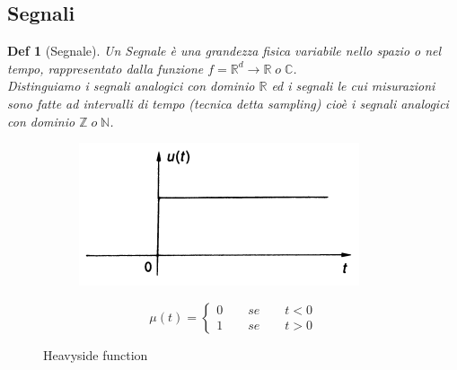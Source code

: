 \documentclass[a4paper]{article}
\newtheorem*{definition}{Def}
\newcommand{\R}[0]{\mathbb{R}}
\newcommand{\C}[0]{\mathbb{C}}
\begin{document}
\subsection{Segnali}
\begin{definition}[Segnale]
	Un Segnale è una grandezza fisica variabile nello spazio o nel tempo, rappresentato dalla funzione $f = \R^d \rightarrow \R \; o \; \C$.\\
	Distinguiamo i segnali \textit{analogici} con dominio $\R$ ed i segnali le cui misurazioni sono fatte ad intervalli di tempo (tecnica detta \textit{sampling}) cioè i segnali \textit{analogici} con dominio $\mathbb{Z} \; o \; \mathbb{N}$.
\end{definition}
\begin{figure}[H]
	\begin{subfigure}[c]{0.5\textwidth}
	\includegraphics[width=\textwidth]{heavyside_func.png}
\end{subfigure}
	\begin{subfigure}[c]{0.5\textwidth}
		\begin{equation*}
			\mu(t) = 
			\begin{cases}
				0 \qquad se \qquad t<0 \\
				1 \qquad se \qquad t>0 
			\end{cases}
		\end{equation*}
	\end{subfigure}
	\caption{Heavyside function} \label{FIG:heavyside}
\end{figure}
\end{document}
